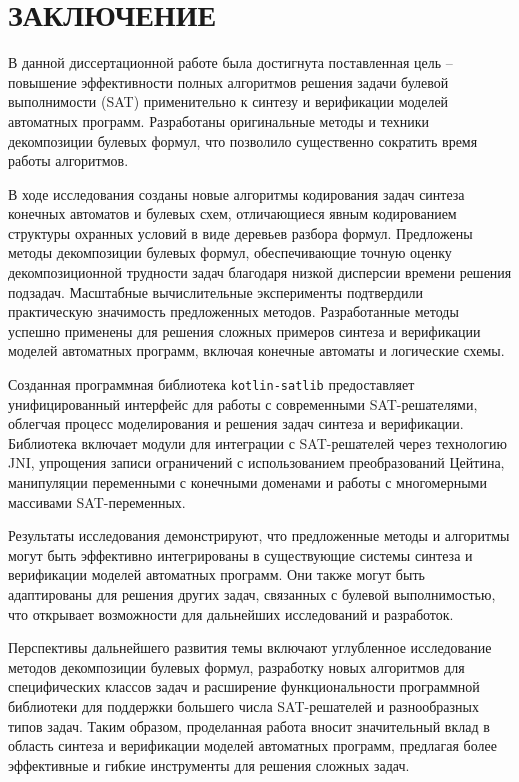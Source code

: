 \chapter*{ЗАКЛЮЧЕНИЕ}

В данной диссертационной работе была достигнута поставленная цель \--- повышение эффективности полных алгоритмов решения задачи булевой выполнимости (SAT) применительно к синтезу и верификации моделей автоматных программ.
Разработаны оригинальные методы и техники декомпозиции булевых формул, что позволило существенно сократить время работы алгоритмов.

В ходе исследования созданы новые алгоритмы кодирования задач синтеза конечных автоматов и булевых схем, отличающиеся явным кодированием структуры охранных условий в виде деревьев разбора формул.
Предложены методы декомпозиции булевых формул, обеспечивающие точную оценку декомпозиционной трудности задач благодаря низкой дисперсии времени решения подзадач.
Масштабные вычислительные эксперименты подтвердили практическую значимость предложенных методов.
Разработанные методы успешно применены для решения сложных примеров синтеза и верификации моделей автоматных программ, включая конечные автоматы и логические схемы.

Созданная программная библиотека \texttt{kotlin-satlib} предоставляет унифицированный интерфейс для работы с современными SAT-решателями, облегчая процесс моделирования и решения задач синтеза и верификации. Библиотека включает модули для интеграции с SAT-решателей через технологию JNI, упрощения записи ограничений с использованием преобразований Цейтина, манипуляции переменными с конечными доменами и работы с многомерными массивами SAT-переменных.

Результаты исследования демонстрируют, что предложенные методы и алгоритмы могут быть эффективно интегрированы в существующие системы синтеза и верификации моделей автоматных программ.
Они также могут быть адаптированы для решения других задач, связанных с булевой выполнимостью, что открывает возможности для дальнейших исследований и разработок.

Перспективы дальнейшего развития темы включают углубленное исследование методов декомпозиции булевых формул, разработку новых алгоритмов для специфических классов задач и расширение функциональности программной библиотеки для поддержки большего числа SAT-решателей и разнообразных типов задач.
Таким образом, проделанная работа вносит значительный вклад в область синтеза и верификации моделей автоматных программ, предлагая более эффективные и гибкие инструменты для решения сложных задач.
